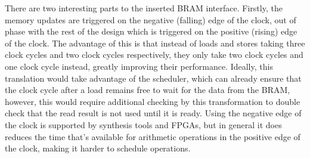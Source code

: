 
There are two interesting parts to the inserted \gls{BRAM} interface.  Firstly, the
memory updates are triggered on the negative (falling) edge of the clock, out of
phase with the rest of the design which is triggered on the positive (rising)
edge of the clock.  The advantage of this is that instead of loads and stores
taking three clock cycles and two clock cycles respectively, they only take two
clock cycles and one clock cycle instead, greatly improving their performance.
Ideally, this translation would take advantage of the scheduler, which can
already ensure that the clock cycle after a load remains free to wait for the
data from the \gls{BRAM}, however, this would require additional checking by this
transformation to double check that the read result is not used until it is
ready.
Using the negative edge of the clock is supported by synthesis tools and FPGAs,
but in general it does reduces the time that's available for arithmetic
operations in the positive edge of the clock, making it harder to schedule
operations.

